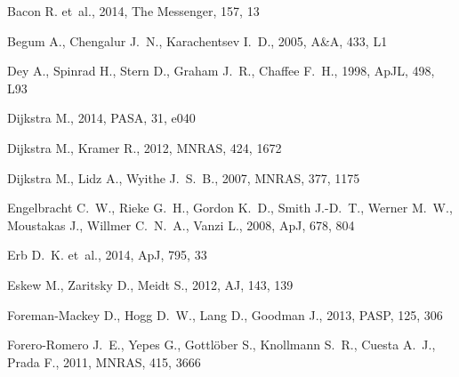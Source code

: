 \documentclass[a4,useAMS,usenatbib,usegraphicx]{mn2e}
\newcommand{\apj}{ApJ}
\newcommand{\pasa}{PASA}
\newcommand{\apjl}{ApJL}
\newcommand{\aj}{AJ}
\newcommand{\mnras}{MNRAS}
\newcommand{\aap}{A\&A}
\newcommand{\pasp}{PASP}
\begin{document}
\begin{thebibliography}{}

{Bacon} R.  et~al., 2014, The Messenger, 157, 13

{Begum} A.,  {Chengalur} J.~N.,    {Karachentsev} I.~D.,  2005, \aap, 433, L1

{Dey} A.,  {Spinrad} H.,  {Stern} D.,  {Graham} J.~R.,    {Chaffee} F.~H.,
  1998, \apjl, 498, L93

{Dijkstra} M.,  2014, \pasa, 31, e040

{Dijkstra} M.,  {Kramer} R.,  2012, \mnras, 424, 1672

{Dijkstra} M.,  {Lidz} A.,    {Wyithe} J.~S.~B.,  2007, \mnras, 377, 1175

{Engelbracht} C.~W.,  {Rieke} G.~H.,  {Gordon} K.~D.,  {Smith} J.-D.~T.,
  {Werner} M.~W.,  {Moustakas} J.,  {Willmer} C.~N.~A.,    {Vanzi} L.,  2008,
  \apj, 678, 804

{Erb} D.~K.  et~al., 2014, \apj, 795, 33

{Eskew} M.,  {Zaritsky} D.,    {Meidt} S.,  2012, \aj, 143, 139

{Foreman-Mackey} D.,  {Hogg} D.~W.,  {Lang} D.,    {Goodman} J.,  2013, \pasp,
  125, 306

{Forero-Romero} J.~E.,  {Yepes} G.,  {Gottl{\"o}ber} S.,  {Knollmann} S.~R.,
  {Cuesta} A.~J.,    {Prada} F.,  2011, \mnras, 415, 3666


\end{thebibliography}
\end{document}
